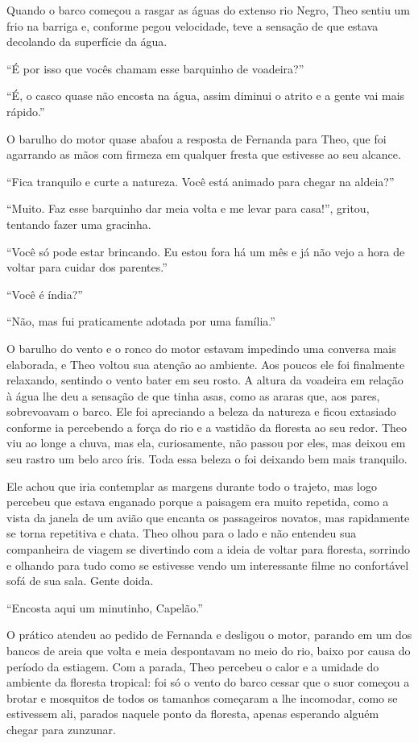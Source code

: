 Quando o barco começou a rasgar as águas do extenso rio Negro, Theo
sentiu um frio na barriga e, conforme pegou velocidade, teve a sensação
de que estava decolando da superfície da água.

``É por isso que vocês chamam esse barquinho de voadeira?''

``É, o casco quase não encosta na água, assim diminui o atrito e a gente
vai mais rápido.''

O barulho do motor quase abafou a resposta de
Fernanda para Theo, que foi agarrando as mãos com firmeza em qualquer
fresta que estivesse ao seu alcance.

``Fica tranquilo e curte a natureza. Você está animado para chegar na
aldeia?''

``Muito. Faz esse barquinho dar meia volta e me levar para casa!'',
gritou, tentando fazer uma gracinha.

``Você só pode estar brincando. Eu estou fora há um mês e já não vejo a
hora de voltar para cuidar dos parentes.''

``Você é índia?''

``Não, mas fui praticamente adotada por uma família.''

O barulho do vento e o ronco do motor estavam impedindo uma
conversa mais elaborada, e Theo voltou sua atenção ao ambiente. Aos
poucos ele foi finalmente relaxando, sentindo o vento bater em seu
rosto. A altura da voadeira em relação à água lhe deu a sensação de que
tinha asas, como as araras que, aos pares, sobrevoavam o barco. Ele
foi apreciando a beleza da natureza e ficou extasiado conforme ia
percebendo a força do rio e a vastidão da floresta ao seu redor. Theo
viu ao longe a chuva, mas ela, curiosamente, não passou por eles, mas
deixou em seu rastro um belo arco íris. Toda essa beleza o foi
deixando bem mais tranquilo.

Ele achou que iria contemplar as margens durante todo o trajeto, mas
logo percebeu que estava enganado porque a paisagem era muito repetida,
como a vista da janela de um avião que encanta os passageiros novatos,
mas rapidamente se torna repetitiva e chata. Theo olhou para o lado e
não entendeu sua companheira de viagem se divertindo com a ideia de
voltar para floresta, sorrindo e olhando para tudo como se estivesse
vendo um interessante filme no confortável sofá de sua sala. Gente
doida.

``Encosta aqui um minutinho, Capelão.''

O prático atendeu ao pedido de
Fernanda e desligou o motor, parando em um dos bancos de areia que volta
e meia despontavam no meio do rio, baixo por causa do período da
estiagem. Com a parada, Theo percebeu o calor e a umidade do ambiente da
floresta tropical: foi só o vento do barco cessar que o suor começou a
brotar e mosquitos de todos os tamanhos começaram a lhe incomodar, como
se estivessem ali, parados naquele ponto da floresta, apenas esperando
alguém chegar para zunzunar.

